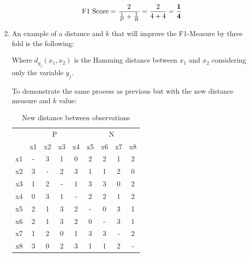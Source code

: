 \documentclass{article}
\begin{document}
\begin{enumerate}[leftmargin=\labelsep]
{\begin{minipage}{\textwidth}
  \begin{equation*}
    \text{F1 Score} = \frac{2}{\frac{1}{P}+\frac{1}{R}} = \frac{2}{4+4} = \frac{\textbf1}{\textbf4}
  \end{equation*}
  \vspace{2pt}
\end{minipage}
}

\item An example of a distance and $k$ that will improve 
the F1-Measure by three fold is the following:


\vspace{2pt}

Where $d_{y_j}(x_1, x_2)$ is the Hamming distance between 
$x_1$ and $x_2$ considering only the variable $y_j$.

To demonstrate the same process as previous but with the
new distance measure and $k$ value:

\begin{table}[H]
  \centering
  \begin{tabular}{c|cccc|cccc|}
    \multicolumn{1}{c}{} & \multicolumn{4}{c}{P} & \multicolumn{4}{c}{N}  \\
      & x1 & x2 & x3 & x4 & x5 & x6 & x7 & x8 \\ \hline
  x1  & -  & 3  & 1  & 0  & 2  & 2  & 1  & 2  \\
  x2  & 3  & -  & 2  & 3  & 1  & 1  & 2  & 0  \\
  x3  & 1  & 2  & -  & 1  & 3  & 3  & 0  & 2  \\
  x4  & 0  & 3  & 1  & -  & 2  & 2  & 1  & 2  \\
  x5  & 2  & 1  & 3  & 2  & -  & 0  & 3  & 1  \\
  x6  & 2  & 1  & 3  & 2  & 0  & -  & 3  & 1  \\
  x7  & 1  & 2  & 0  & 1  & 3  & 3  & -  & 2  \\
  x8  & 3  & 0  & 2  & 3  & 1  & 1  & 2  & -  \\ \hline
  \end{tabular}
  \caption{New distance between observations}
\end{table}


\end{enumerate}
\end{document}
